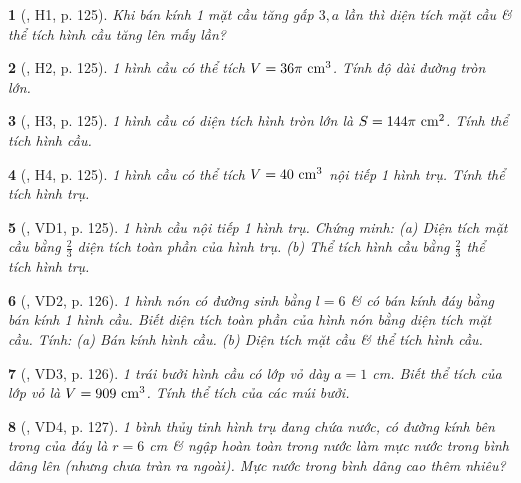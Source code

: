 \documentclass{article}
\newtheorem{baitoan}{}
\begin{document}
\begin{baitoan}[\cite{Binh_boi_duong_Toan_9_tap_2}, H1, p. 125]
	Khi bán kính 1 mặt cầu tăng gấp $3,a$ lần thì diện tích mặt cầu \& thể tích hình cầu tăng lên mấy lần?
\end{baitoan}

\begin{baitoan}[\cite{Binh_boi_duong_Toan_9_tap_2}, H2, p. 125]
	1 hình cầu có thể tích $V = 36\pi\ {\rm cm}^3$. Tính độ dài đường tròn lớn.
\end{baitoan}

\begin{baitoan}[\cite{Binh_boi_duong_Toan_9_tap_2}, H3, p. 125]
	1 hình cầu có diện tích hình tròn lớn là $S = 144\pi\ {\rm cm}^2$. Tính thể tích hình cầu.
\end{baitoan}

\begin{baitoan}[\cite{Binh_boi_duong_Toan_9_tap_2}, H4, p. 125]
	1 hình cầu có thể tích $V = 40\ {\rm cm}^3$ nội tiếp 1 hình trụ. Tính thể tích hình trụ.
\end{baitoan}

\begin{baitoan}[\cite{Binh_boi_duong_Toan_9_tap_2}, VD1, p. 125]
	1 hình cầu nội tiếp 1 hình trụ. Chứng minh: (a) Diện tích mặt cầu bằng $\frac{2}{3}$ diện tích toàn phần của hình trụ. (b) Thể tích hình cầu bằng $\frac{2}{3}$ thể tích hình trụ.
\end{baitoan}

\begin{baitoan}[\cite{Binh_boi_duong_Toan_9_tap_2}, VD2, p. 126]
	1 hình nón có đường sinh bằng $l = 6$ \& có bán kính đáy bằng bán kính 1 hình cầu. Biết diện tích toàn phần của hình nón bằng diện tích mặt cầu. Tính: (a) Bán kính hình cầu. (b) Diện tích mặt cầu \& thể tích hình cầu.
\end{baitoan}

\begin{baitoan}[\cite{Binh_boi_duong_Toan_9_tap_2}, VD3, p. 126]
	1 trái bưởi hình cầu có lớp vỏ dày $a = 1$ {\rm cm}. Biết thể tích của lớp vỏ là $V = 909\ {\rm cm}^3$. Tính thể tích của các múi bưởi.
\end{baitoan}

\begin{baitoan}[\cite{Binh_boi_duong_Toan_9_tap_2}, VD4, p. 127]
	1 bình thủy tinh hình trụ đang chứa nước, có đường kính bên trong của đáy là $r = 6$ {\rm cm} \& ngập hoàn toàn trong nước làm mực nước trong bình dâng lên (nhưng chưa tràn ra ngoài). Mực nước trong bình dâng cao thêm nhiêu?
\end{baitoan}
\end{document}
